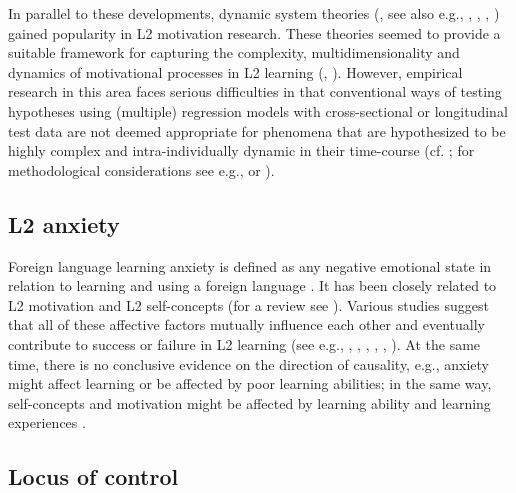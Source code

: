 \documentclass[output=paper]{langscibook}
\begin{document}
\begin{sloppypar}
In parallel to these developments, dynamic system theories (\citealt{LarsenFreeman1997}, see also e.g., \citealt{EllisLarsenFreeman2006}, \citealt{DeBotEtAl2007}, \citealt{LarsenFreemanCameron2008}, \citealt{LarsenFreeman2017}) gained popularity in L2 motivation research. These theories seemed to provide a suitable framework for capturing the complexity, multidimensionality and dynamics of motivational processes in L2 learning (\citealt{Doernyei2010ZweiterEintrag}, \citealt{Waninge2015}). However, empirical research in this area faces serious difficulties in that conventional ways of testing hypotheses using (multiple) regression models with cross-sectional or longitudinal test data are not deemed appropriate for phenomena that are hypothesized to be highly complex and intra-individually dynamic in their time-course (cf. \citealt{Doernyei2014}; for methodological considerations see e.g., \citealt{VerspoorEtAl2011} or \citealt{DoernyeiEtAl2015}).
\end{sloppypar}

\subsection{L2 anxiety} %

Foreign language learning anxiety is defined as any negative emotional state in relation to learning and using a foreign language \citep{MacIntyre1999}. It has been closely related to L2 motivation and L2 self-concepts (for a review see \citealt{Horwitz2001}). Various studies suggest that all of these affective factors mutually influence each other and eventually contribute to success or failure in L2 learning (see e.g., \citealt{NoelsEtAl2000}, \citealt{PekrunEtAl2002}, \citealt{Stoeckli2004}, \citealt{KormosCsizer2008}, \citealt{LiuHuang2011}, \citealt{Heinzmann2013}). At the same time, there is no conclusive evidence on the direction of causality, e.g., anxiety might affect learning or be affected by poor learning abilities; in the same way, self-concepts and motivation might be affected by learning ability and learning experiences \citep{SparksEtAl2011}.

\subsection{Locus of control} %
\end{document}
